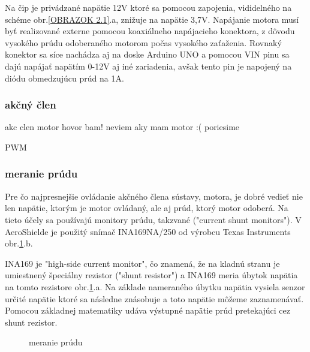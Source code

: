 Na čip je privádzané napätie 12V ktoré sa pomocou zapojenia, vididelného na schéme obr.\ref{OBRAZOK 2.1}.a, znižuje na napätie 3,7V. Napájanie motora musí byť realizované externe pomocou koaxiálneho napájacieho konektora, z dôvodu vysokého prúdu odoberaného motorom počas vysokého zaťaženia. Rovnaký konektor sa síce nachádza aj na doske Arduino UNO a pomocou VIN pinu sa dajú napájať napätím 0-12V aj iné zariadenia, avšak tento pin je napojený na diódu obmedzujúcu prúd na 1A\cite{ampere}\cite{ampere2}.



\subsubsection{akčný člen}
\label{akcclen}

akc clen motor hovor bam!
neviem aky mam motor :(
poriesime

PWM 

\vspace{4cm}

\subsubsection{meranie prúdu}
\label{merprud}

Pre čo najpresnejšie ovládanie akčného člena sústavy, motora, je dobré vedieť nie len napätie, ktorým je motor ovládaný, ale aj prúd, ktorý motor odoberá. Na tieto účely sa používajú monitory prúdu, takzvané ("current shunt monitors"). V AeroShielde je použitý snímač INA169NA/250 od výrobcu Texas Instruments obr.\ref{OBRAZOK 2.3}.b.

INA169 je "high-side current monitor", čo znamená, že na kladnú stranu je umiestnený špeciálny rezistor ("shunt resistor") a INA169 meria úbytok napätia na tomto rezistore obr.\ref{OBRAZOK 2.3}.a. Na základe nameraného úbytku napätia vysiela senzor určité napätie ktoré sa následne znásobuje a toto napätie môžeme zaznamenávať. Pomocou základnej matematiky udáva výstupné napätie prúd pretekajúci cez shunt rezistor\cite{INA}.

\begin{figure}[!tbh]
\hfill
{}
\hfill
{}
\hfill
\caption{meranie prúdu}\label{OBRAZOK 2.3}
\end{figure}


